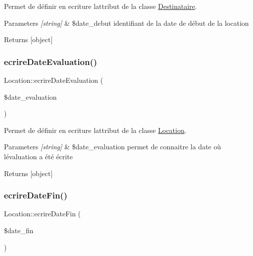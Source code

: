 Permet de définir en ecriture l\textquotesingle{}attribut de la classe \hyperlink{class_destinataire}{Destinataire}. 


\begin{DoxyParams}{Parameters}
{\em \mbox{[}string\mbox{]}} & \$date\+\_\+debut identifiant de la date de début de la location \\
\hline
\end{DoxyParams}
\begin{DoxyReturn}{Returns}
\mbox{[}object\mbox{]} 
\end{DoxyReturn}
\mbox{\label{class_location_a6a2d79406521e460cb6754c30e53c991}} 
\subsubsection{\texorpdfstring{ecrire\+Date\+Evaluation()}{ecrireDateEvaluation()}}
{\footnotesize\ttfamily Location\+::ecrire\+Date\+Evaluation (\begin{DoxyParamCaption}\item[{}]{\$date\+\_\+evaluation }\end{DoxyParamCaption})}



Permet de définir en ecriture l\textquotesingle{}attribut de la classe \hyperlink{class_location}{Location}. 


\begin{DoxyParams}{Parameters}
{\em \mbox{[}string\mbox{]}} & \$date\+\_\+evaluation permet de connaitre la date où l\textquotesingle{}évaluation a été écrite \\
\hline
\end{DoxyParams}
\begin{DoxyReturn}{Returns}
\mbox{[}object\mbox{]} 
\end{DoxyReturn}
\mbox{\label{class_location_a84998ce017d5d9716e0c264352d33587}} 
\subsubsection{\texorpdfstring{ecrire\+Date\+Fin()}{ecrireDateFin()}}
{\footnotesize\ttfamily Location\+::ecrire\+Date\+Fin (\begin{DoxyParamCaption}\item[{}]{\$date\+\_\+fin }\end{DoxyParamCaption})}



